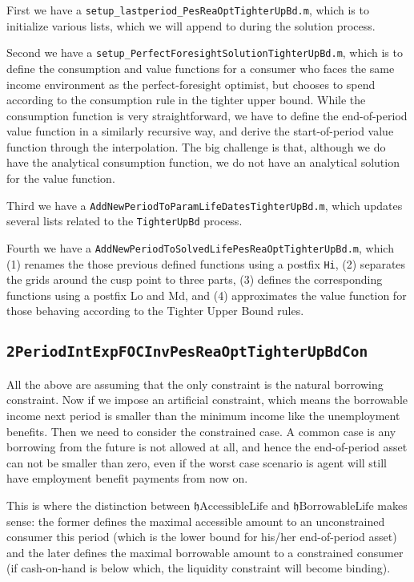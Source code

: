 \documentclass[titlepage,abstract]{\econtex}
\providecommand{\hEndBorrowableLife}{\mathfrak{h}\text{BorrowableLife}}
\providecommand{\hEndAccessibleLife}{\mathfrak{h}\text{AccessibleLife}}
\begin{document}
First we have a \texttt{setup\_lastperiod\_PesReaOptTighterUpBd.m}, which is to initialize various lists, which we will append to during the solution process.

Second we have a \texttt{setup\_PerfectForesightSolutionTighterUpBd.m}, which is to define the consumption and value functions for a consumer who faces the same income environment as the perfect-foresight optimist, but chooses to spend according to the consumption rule in the tighter upper bound. While the consumption function is very straightforward, we have to define the end-of-period value function in a similarly recursive way, and derive the start-of-period value function through the interpolation. The big challenge is that, although we do have the analytical consumption function, we do not have an analytical solution for the value function.

Third we have a \texttt{AddNewPeriodToParamLifeDatesTighterUpBd.m}, which updates several lists related to the \texttt{TighterUpBd} process.

Fourth we have a \texttt{AddNewPeriodToSolvedLifePesReaOptTighterUpBd.m}, which (1) renames the those previous defined
functions using a postfix \texttt{Hi}, (2) separates the grids around the cusp point to three parts, (3) defines the corresponding functions using a postfix {Lo} and {Md}, and (4) approximates the value function for those behaving according to the Tighter Upper Bound rules.

\subsection{\texttt{2PeriodIntExpFOCInvPesReaOptTighterUpBdCon}}
All the above are assuming that the only constraint is the natural borrowing constraint. Now if we impose an artificial constraint, which means the borrowable income next period is smaller than the minimum income like the unemployment benefits. Then we need to consider the constrained case. A common case is any borrowing from the future is not allowed at all, and hence the end-of-period asset can not be smaller than zero, even if the worst case scenario is agent will still have employment benefit payments from now on.

This is where the distinction between $\hEndAccessibleLife$ and $\hEndBorrowableLife$ makes sense: the former defines the maximal accessible amount to an unconstrained consumer this period (which is the lower bound for his/her end-of-period asset) and the later defines the maximal borrowable amount to a constrained consumer (if cash-on-hand is below which, the liquidity constraint will become binding).
\end{document}
